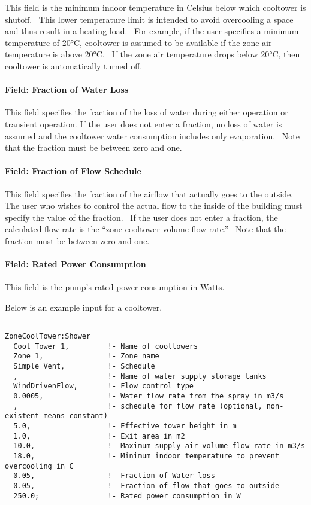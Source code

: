 This field is the minimum indoor temperature in Celsius below which cooltower is shutoff. ~This lower temperature limit is intended to avoid overcooling a space and thus result in a heating load. ~For example, if the user specifies a minimum temperature of 20°C, cooltower is assumed to be available if the zone air temperature is above 20°C. ~If the zone air temperature drops below 20°C, then cooltower is automatically turned off.

\paragraph{Field: Fraction of Water Loss}\label{field-fraction-of-water-loss}

This field specifies the fraction of the loss of water during either operation or transient operation. If the user does not enter a fraction, no loss of water is assumed and the cooltower water consumption includes only evaporation.~ Note that the fraction must be between zero and one.

\paragraph{Field: Fraction of Flow Schedule}\label{field-fraction-of-flow-schedule}

This field specifies the fraction of the airflow that actually goes to the outside.~ The user who wishes to control the actual flow to the inside of the building must specify the value of the fraction.~ If the user does not enter a fraction, the calculated flow rate is the ``zone cooltower volume flow rate.''~ Note that the fraction must be between zero and one.

\paragraph{Field: Rated Power Consumption}\label{field-rated-power-consumption}

This field is the pump's rated power consumption in Watts.

Below is an example input for a cooltower.

\begin{lstlisting}

ZoneCoolTower:Shower
  Cool Tower 1,         !- Name of cooltowers
  Zone 1,               !- Zone name
  Simple Vent,          !- Schedule
  ,                     !- Name of water supply storage tanks
  WindDrivenFlow,       !- Flow control type
  0.0005,               !- Water flow rate from the spray in m3/s
  ,                     !- schedule for flow rate (optional, non-existent means constant)
  5.0,                  !- Effective tower height in m
  1.0,                  !- Exit area in m2
  10.0,                 !- Maximum supply air volume flow rate in m3/s
  18.0,                 !- Minimum indoor temperature to prevent overcooling in C
  0.05,                 !- Fraction of Water loss
  0.05,                 !- Fraction of flow that goes to outside
  250.0;                !- Rated power consumption in W
\end{lstlisting}

